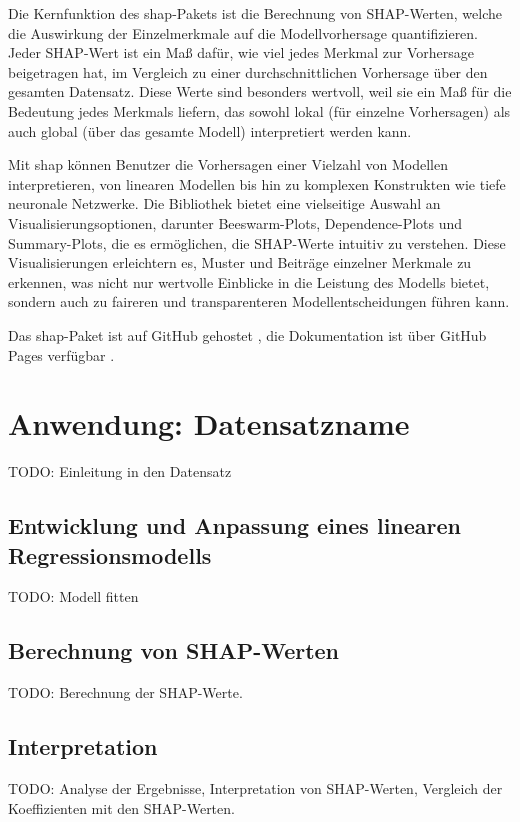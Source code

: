 Die Kernfunktion des \textsf{shap}-Pakets ist die Berechnung von \acs{SHAP}-Werten, welche die Auswirkung der 
Einzelmerkmale auf die Modellvorhersage quantifizieren. Jeder \acs{SHAP}-Wert ist ein Maß dafür, wie viel jedes Merkmal 
zur Vorhersage beigetragen hat, im Vergleich zu einer durchschnittlichen Vorhersage über den gesamten Datensatz. 
Diese Werte sind besonders wertvoll, weil sie ein Maß für die Bedeutung jedes Merkmals liefern, 
das sowohl lokal (für einzelne Vorhersagen) als auch global (über das gesamte Modell) interpretiert werden kann.

Mit \textsf{shap} können Benutzer die Vorhersagen einer Vielzahl von Modellen interpretieren, 
von linearen Modellen bis hin zu komplexen Konstrukten wie tiefe neuronale Netzwerke. 
Die Bibliothek bietet eine vielseitige Auswahl an Visualisierungsoptionen, darunter Beeswarm-Plots, Dependence-Plots und 
Summary-Plots, die es ermöglichen, die \acs{SHAP}-Werte intuitiv zu verstehen.
Diese Visualisierungen erleichtern es, Muster und Beiträge einzelner Merkmale zu erkennen, 
was nicht nur wertvolle Einblicke in die Leistung des Modells bietet, sondern auch zu faireren und transparenteren 
Modellentscheidungen führen kann. 

Das \textsf{shap}-Paket ist auf GitHub gehostet \cite{github_shap}, die Dokumentation ist über GitHub Pages verfügbar \cite{shap_docs}.

\section{Anwendung: Datensatzname}

TODO: Einleitung in den Datensatz

\subsection{Entwicklung und Anpassung eines linearen Regressionsmodells}

TODO: Modell fitten

\subsection{Berechnung von \acs{SHAP}-Werten}

TODO: Berechnung der \acs{SHAP}-Werte.

\subsection{Interpretation}

TODO: Analyse der Ergebnisse, Interpretation von \acs{SHAP}-Werten, Vergleich der Koeffizienten mit den \acs{SHAP-Werten}.